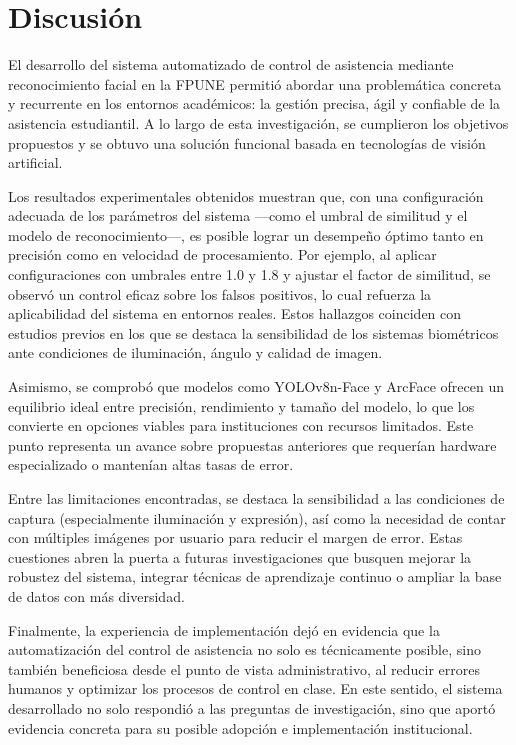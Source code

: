 \fancyhead{}
\fancyfoot{}
\cfoot{\thepage}


\chapter{Discusión}

El desarrollo del sistema automatizado de control de asistencia mediante reconocimiento facial en la FPUNE permitió abordar una problemática concreta y recurrente en los entornos académicos: la gestión precisa, ágil y confiable de la asistencia estudiantil. A lo largo de esta investigación, se cumplieron los objetivos propuestos y se obtuvo una solución funcional basada en tecnologías de visión artificial.

Los resultados experimentales obtenidos muestran que, con una configuración adecuada de los parámetros del sistema —como el umbral de similitud y el modelo de reconocimiento—, es posible lograr un desempeño óptimo tanto en precisión como en velocidad de procesamiento. Por ejemplo, al aplicar configuraciones con umbrales entre 1.0 y 1.8 y ajustar el factor de similitud, se observó un control eficaz sobre los falsos positivos, lo cual refuerza la aplicabilidad del sistema en entornos reales. Estos hallazgos coinciden con estudios previos en los que se destaca la sensibilidad de los sistemas biométricos ante condiciones de iluminación, ángulo y calidad de imagen.

Asimismo, se comprobó que modelos como YOLOv8n-Face y ArcFace ofrecen un equilibrio ideal entre precisión, rendimiento y tamaño del modelo, lo que los convierte en opciones viables para instituciones con recursos limitados. Este punto representa un avance sobre propuestas anteriores que requerían hardware especializado o mantenían altas tasas de error.


Entre las limitaciones encontradas, se destaca la sensibilidad a las condiciones de captura (especialmente iluminación y expresión), así como la necesidad de contar con múltiples imágenes por usuario para reducir el margen de error. Estas cuestiones abren la puerta a futuras investigaciones que busquen mejorar la robustez del sistema, integrar técnicas de aprendizaje continuo o ampliar la base de datos con más diversidad.

Finalmente, la experiencia de implementación dejó en evidencia que la automatización del control de asistencia no solo es técnicamente posible, sino también beneficiosa desde el punto de vista administrativo, al reducir errores humanos y optimizar los procesos de control en clase. En este sentido, el sistema desarrollado no solo respondió a las preguntas de investigación, sino que aportó evidencia concreta para su posible adopción e implementación institucional.


